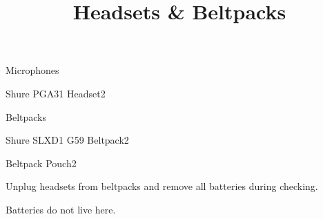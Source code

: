 \def\papersize{5}




\title{Headsets \& Beltpacks}

\begin{checklist}{Microphones}
  \item{Shure PGA31 Headset}{2}
\end{checklist}

\begin{checklist}{Beltpacks}
  \item{Shure SLXD1 G59 Beltpack}{2}
  \item{Beltpack Pouch}{2}
\end{checklist}

Unplug headsets from beltpacks and remove all batteries during checking.

Batteries do not live here.


